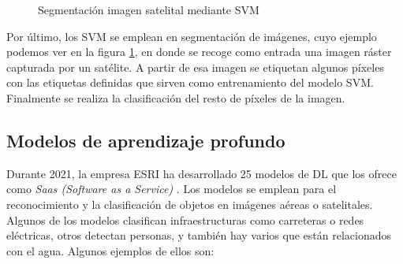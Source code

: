 \begin{figure}[H]
    \centering
    \caption{Segmentación imagen satelital mediante SVM} \label{fig:ejemplo-SVM} 
  \end{figure} 

Por último, los SVM se emplean en segmentación de imágenes, cuyo ejemplo podemos ver en la figura \ref{fig:ejemplo-SVM}, en donde se recoge como entrada una imagen ráster capturada por un satélite.
A partir de esa imagen se etiquetan algunos píxeles con las etiquetas definidas que sirven como entrenamiento del modelo SVM.
Finalmente se realiza la clasificación del resto de píxeles de la imagen.

\subsection{Modelos de aprendizaje profundo}
Durante 2021, la empresa ESRI ha desarrollado 25 modelos de DL que los ofrece como \textit{Saas (Software as a Service)} \cite{DeepLearningArcGIS}.
Los modelos se emplean para el reconocimiento y la clasificación de objetos en imágenes aéreas o satelitales. 
Algunos de los modelos clasifican infraestructuras como carreteras o redes eléctricas, otros detectan personas, y también hay varios que están relacionados con el agua.
Algunos ejemplos de ellos son:

